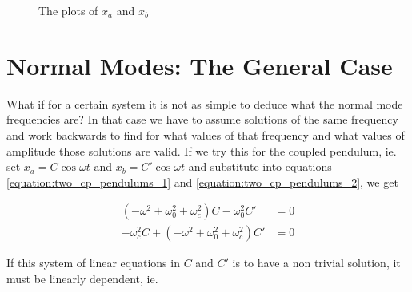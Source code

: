 \documentclass[a4paper,10pt]{article}
\begin{document}
\begin{figure}[!h]
	\centering
  \caption{The plots of $x_a$ and $x_b$}
  \label{fig:two_cp_plot}
\end{figure}%

\section{Normal Modes: The General Case}

What if for a certain system it is not as simple to deduce what the normal mode frequencies are? In that case we have to assume solutions of the same
frequency and work backwards to find for what values of that frequency and what values of amplitude those solutions are valid. If we try this for
the coupled pendulum, ie. set $x_a = C\cos{\omega t}$ and $x_b = C'\cos{\omega t}$ and substitute into equations \ref{equation:two_cp_pendulums_1}
and \ref{equation:two_cp_pendulums_2}, we get

\begin{align}
\label{equation:lin_eq_c}
(-\omega^2 + \omega_0^2 + \omega_c^2)C - \omega_0^2C' &= 0\\
\label{equation:lin_eq_c_2}
-\omega_c^2C + (-\omega^2 + \omega_0^2 + \omega_c^2)C' &= 0
\end{align}

If this system of linear equations in $C$ and $C'$ is to have a non trivial solution, it must be linearly dependent, ie.
\end{document}
